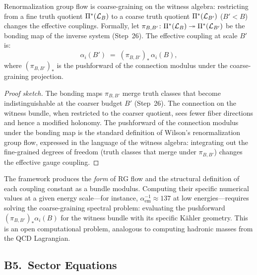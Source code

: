 \begin{theorem}
\label{thm:rg-flow}
Renormalization group flow is coarse-graining on the witness algebra:
restricting from a fine truth quotient $\Pi^*(\mathcal{L}_B)$ to a coarse truth
quotient $\Pi^*(\mathcal{L}_{B'})$ ($B' < B$) changes the effective couplings.
Formally, let $\pi_{B,B'} \colon \Pi^*(\mathcal{L}_B) \twoheadrightarrow
\Pi^*(\mathcal{L}_{B'})$ be the bonding map of the inverse system (Step~26).
The effective coupling at scale $B'$ is:
\[
  \alpha_i(B') \;=\; (\pi_{B,B'})_*\, \alpha_i(B),
\]
where $(\pi_{B,B'})_*$ is the pushforward of the connection modulus under
the coarse-graining projection.
\begin{proof}[Proof sketch]
The bonding maps $\pi_{B,B'}$ merge truth classes that become
indistinguishable at the coarser budget $B'$ (Step~26).  The connection on
the witness bundle, when restricted to the coarser quotient, sees fewer
fiber directions and hence a modified holonomy.  The pushforward of the
connection modulus under the bonding map is the standard definition of
Wilson's renormalization group flow, expressed in the language of the
witness algebra: integrating out the fine-grained degrees of freedom
(truth classes that merge under $\pi_{B,B'}$) changes the effective gauge
coupling.

\end{proof}
\end{theorem}

\begin{remark}
\label{rem:coupling-boundary}
The framework produces the \emph{form} of RG flow and the structural
definition of each coupling constant as a bundle modulus.  Computing their
specific numerical values at a given energy scale---for instance,
$\alpha_{\mathrm{em}}^{-1} \approx 137$ at low energies---requires solving
the coarse-graining spectral problem: evaluating the pushforward
$(\pi_{B,B'})_* \alpha_i(B)$ for the witness bundle with its specific
K\"{a}hler geometry.  This is an open computational problem, analogous to
computing hadronic masses from the QCD Lagrangian.
\end{remark}

\subsection{B5.\ Sector Equations}
\label{sec:physics:equations}

